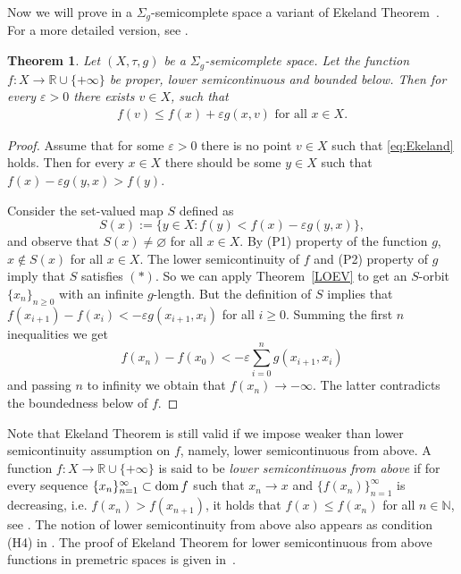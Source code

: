 \documentclass[12pt]{article}
\newtheorem{theorem}{Theorem}[section]
\def\dom{\mathop{\rm dom}}
\newcommand{\R}{\mathbb{R}}
\newcommand{\N}{\mathbb{N}}
\newcommand{\eps}{{\varepsilon}}
\begin{document}
Now we will prove  in a  $\Sigma_g$-semicomplete space  a variant of Ekeland Theorem~\cite{Ekeland}. For a more detailed version, see \cite{ka-z-conf}.

\begin{theorem} \label{th:Ekeland}
Let $(X,\tau,g)$ be a $\Sigma_g$-semicomplete space. Let the function $f: X \rightarrow \R \cup \{+\infty\}$ be proper, lower semicontinuous and bounded below. Then for every $\varepsilon>0$ there exists $v \in X$, such that
\begin{eqnarray}
f(v) \leq f(x)+\varepsilon g(x,v) \text{ for all } x\in X. \label{eq:Ekeland}
\end{eqnarray}
\end{theorem}

\begin{proof}
Assume that for some $\eps >0$ there is no point $v \in X$ such that \eqref{eq:Ekeland} holds. Then for every $x\in X$ there should be some $y\in X$ such that
$f(x)-\eps g(y,x)>f(y)$.

Consider the set-valued map $S$ defined as
\[S(x):=\{y \in X: f(y)<f(x)-\varepsilon g(y,x)\},\]
and observe that $S(x) \neq \varnothing$ for all $x \in X$. By (P1) property  of the function $g$, $x \not\in S(x)$ for all $x \in X$. The lower semicontinuity of $f$ and (P2) property of $g$ imply that $S$ satisfies $(\ast)$. So we can apply Theorem~\ref{LOEV} to get an $S$-orbit $\{x_n\}_{n\ge 0}$ with an infinite $g$-length.
But the definition of $S$ implies that $f(x_{i+1})-f(x_i)<-\varepsilon g(x_{i+1},x_{i})$ for all $i\ge 0$. Summing the first $n$ inequalities we get
\[
f(x_{n})-f(x_0)<-\varepsilon \sum_{i=0}^n g(x_{i+1},x_{i})
\]
and passing $n$ to  infinity we obtain that  $f(x_n) \rightarrow -\infty$. The latter contradicts the boundedness below of  $f$.
\end{proof}

Note that Ekeland Theorem is still valid if we impose weaker than lower semicontinuity assumption on $f$, namely, lower semicontinuous from above. A function $f: X \to \mathbb{R} \cup \{ + \infty \}$ is said to be \emph{lower semicontinuous from above} if for every sequence $\{x_n\}_{n=1}^\infty \subset \dom f$ such that $x_n \to x $ and $\{f(x_n)\}_{n=1}^\infty$ is decreasing, i.e. $f(x_n)>f(x_{n+1})$, it holds that $f(x) \leq f(x_n)$ for all $n \in \N$, see \cite{KS}. The notion of lower semicontinuity from above also appears as condition (H4) in  \cite[Subsection 3.11.1]{Tammer-book}. The proof of Ekeland Theorem for lower semicontinuous from above functions in premetric spaces is given in~\cite{ka-z-conf}.
\end{document}
